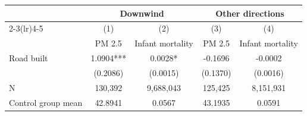 {
\def\sym#1{\ifmmode^{#1}\else\(^{#1}\)\fi}
\begin{tabular}{l*{4}{c}}
\hline\hline
                         &\multicolumn{2}{c}{Downwind}   &\multicolumn{2}{c}{Other directions}\\\cmidrule(lr){2-3}\cmidrule(lr){4-5}
                         &\multicolumn{1}{c}{(1)}&\multicolumn{1}{c}{(2)}&\multicolumn{1}{c}{(3)}&\multicolumn{1}{c}{(4)}\\
                         &\multicolumn{1}{c}{PM 2.5}&\multicolumn{1}{c}{Infant mortality}&\multicolumn{1}{c}{PM 2.5}&\multicolumn{1}{c}{Infant mortality}\\
\hline
Road built               &      1.0904***&      0.0028*  &     -0.1696   &     -0.0002   \\
                         &    (0.2086)   &    (0.0015)   &    (0.1370)   &    (0.0016)   \\
\hline
N                        &     130,392   &   9,688,043   &     125,425   &   8,151,931   \\
Control group mean       &     42.8941   &      0.0567   &     43.1935   &      0.0591   \\
\hline\hline
\end{tabular}
}
